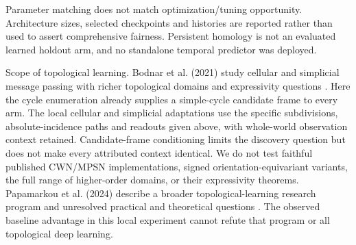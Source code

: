 \documentclass{article}
\begin{document}
\begin{center}
\end{center}

Parameter matching does not match optimization/tuning opportunity. Architecture sizes, selected checkpoints and histories are reported rather than used to assert comprehensive fairness. Persistent homology is not an evaluated learned holdout arm, and no standalone temporal predictor was deployed.

Scope of topological learning. Bodnar et al. (2021) study cellular and simplicial message passing with richer topological domains and expressivity questions \citep{CWN2021} \citep{MPSN2021}. Here the cycle enumeration already supplies a simple-cycle candidate frame to every arm. The local cellular and simplicial adaptations use the specific subdivisions, absolute-incidence paths and readouts given above, with whole-world observation context retained. Candidate-frame conditioning limits the discovery question but does not make every attributed context identical. We do not test faithful published CWN/MPSN implementations, signed orientation-equivariant variants, the full range of higher-order domains, or their expressivity theorems. Papamarkou et al. (2024) describe a broader topological-learning research program and unresolved practical and theoretical questions \citep{PAPAMARKOU2024}. The observed baseline advantage in this local experiment cannot refute that program or all topological deep learning.
\end{document}
